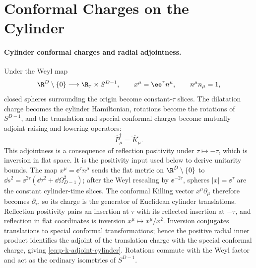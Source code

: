 \section{Conformal Charges on the Cylinder}

\paragraph{Cylinder conformal charges and radial adjointness.}
Under the Weyl map
\[
  \R^D\setminus\{0\}\longrightarrow \R_\tau\times S^{D-1},
  \qquad
  x^\mu=\ee^\tau n^\mu,
  \qquad
  n^\mu n_\mu=1,
\]
closed spheres surrounding the origin become constant-\(\tau\) slices.  The
dilatation charge becomes the cylinder Hamiltonian, rotations become the
rotations of \(S^{D-1}\), and the translation and special conformal charges
become mutually adjoint raising and lowering operators:
\begin{equation}
  \widehat P_\mu^\dagger=\widehat K_\mu .
  \label{eq:p-k-adjoint-cylinder}
\end{equation}
This adjointness is a consequence of reflection positivity under
\(\tau\mapsto-\tau\), which is inversion in flat space.  It is the positivity
input used below to derive unitarity bounds.
The map \(x^\mu=\ee^\tau n^\mu\) sends the flat metric on
\(\R^D\setminus\{0\}\) to
\(\dd s^2=\ee^{2\tau}(\dd\tau^2+\dd\Omega_{D-1}^2)\); after the Weyl
rescaling by \(\ee^{-2\tau}\), spheres \(|x|=\ee^\tau\) are the constant
cylinder-time slices.  The conformal Killing vector \(x^\mu\partial_\mu\)
therefore becomes \(\partial_\tau\), so its charge is the generator of
Euclidean cylinder translations.  Reflection positivity pairs an insertion at
\(\tau\) with its reflected insertion at \(-\tau\), and reflection in flat
coordinates is inversion \(x^\mu\mapsto x^\mu/x^2\).  Inversion conjugates
translations to special conformal transformations; hence the positive radial
inner product identifies the adjoint of the translation charge with the
special conformal charge, giving \eqref{eq:p-k-adjoint-cylinder}.  Rotations
commute with the Weyl factor and act as the ordinary isometries of
\(S^{D-1}\).

